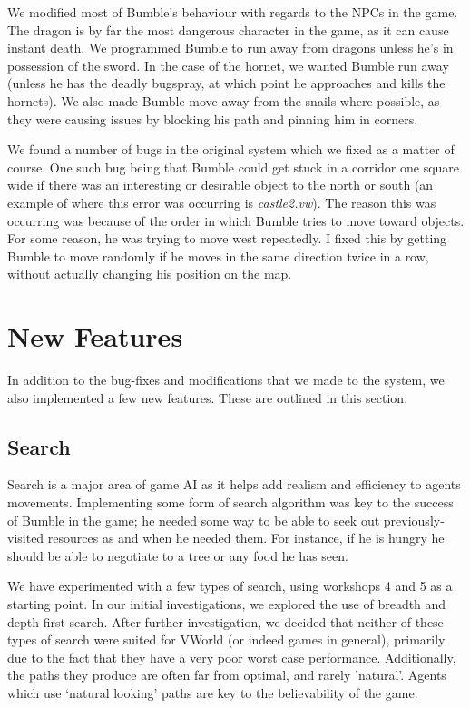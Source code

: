 \documentclass[a4paper,oneside]{report}
\begin{document}
We modified most of Bumble's behaviour with regards to the NPCs in the game. The dragon is by far the most dangerous character in the game, as it can cause instant death. We programmed Bumble to run away from dragons unless he's in possession of the sword. In the case of the hornet, we wanted Bumble run away (unless he has the deadly bugspray, at which point he approaches and kills the hornets). We also made Bumble move away from the snails where possible, as they were causing issues by blocking his path and pinning him in corners.

We found a number of bugs in the original system which we fixed as a matter of course. One such bug being that Bumble could get stuck in a corridor one square wide if there was an interesting or desirable object to the north or south (an example of where this error was occurring is \emph{castle2.vw}). The reason this was occurring was because of the order in which Bumble tries to move toward objects. For some reason, he was trying to move west repeatedly. I fixed this by getting Bumble to move randomly if he moves in the same direction twice in a row, without actually changing his position on the map.

\section{New Features}

In addition to the bug-fixes and modifications that we made to the system, we also implemented a few new features. These are outlined in this section.

\subsection{Search}

Search is a major area of game AI as it helps add realism and efficiency to agents movements. Implementing some form of search algorithm was key to the success of Bumble in the game; he needed some way to be able to seek out previously-visited resources as and when he needed them. For instance, if he is hungry he should be able to negotiate to a tree or any food he has seen. 

We have experimented with a few types of search, using workshops 4 and 5 as a starting point. In our initial investigations, we explored the use of breadth and depth first search. After further investigation, we decided that neither of these types of search were suited for VWorld (or indeed games in general), primarily due to the fact that they have a very poor worst case performance. Additionally, the paths they produce are often far from optimal, and rarely 'natural'. Agents which use `natural looking' paths are key to the believability of the game. 
\end{document}
